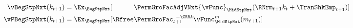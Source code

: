   \begin{equation}\begin{gathered}\begin{aligned}
        \vBegStpNxt(k_{\stp+1})  & = \Ex_{\BegStpNxt}[\phantom{\Rfree}\PermGroFacAdjVNxt{\vFunc}_{\MidStpNxt}(\RNrm_{\stp+1}k_{\stp}+{\TranShkEmp}_{\stp+1})]  \label{eq:vFuncBegtpdefn}
\\  {\vPBegStpNxt}(k_{\stp+1})  & = \Ex_{\BegStpNxt}[\Rfree \PermGroFac_{\stp+1}^{\phantom{1}-\CRRA} \vFunc_{\MidStpNxt}^{m}(m_{\stp+1})]
  \end{aligned}\end{gathered}\end{equation}
